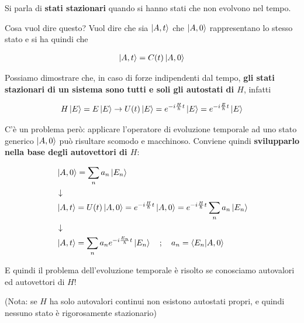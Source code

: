 Si parla di \textbf{stati stazionari} quando si hanno stati che non evolvono nel tempo.

Cosa vuol dire  questo? Vuol dire che sia $\ket{A,t}$ che $\ket{A,0}$ rappresentano lo stesso stato e si ha quindi che

\begin{align}
\ket{A,t}= C(t)\ket{A,0}
\end{align}

Possiamo dimostrare che, in caso di forze indipendenti dal tempo, \textbf{gli stati stazionari di un sistema sono tutti e soli gli autostati di $H$}, infatti

\begin{align}
H\ket{E}= E\ket{E} \rightarrow U(t)\ket{E}= e^{-i\frac{H}{\hbar}t} \ket{E}=e^{-i\frac{E}{\hbar}t} \ket{E}
\end{align}

\bigskip


C'è un problema però: applicare l'operatore di evoluzione temporale ad uno stato generico $\ket{A,0}$ può risultare scomodo e macchinoso. Conviene quindi \textbf{svilupparlo nella base degli autovettori di $H$}:
	
\begin{align}
{}&\ket{A,0}= \sum_{n}a_n \ket{E_n} \\
&\downarrow \nonumber \\
&\ket{A,t}=U(t)\ket{A,0}=e^{-i\frac{H}{\hbar}t}\ket{A,0}= e^{-i\frac{H}{\hbar}t}\sum_{n}a_n \ket{E_n}\\
&\downarrow \nonumber \\
&\ket{A,t}= \sum_{n}a_n e^{-i\frac{E_n}{\hbar}t} \ket{E_n} \quad ; \quad a_n =\braket{E_n|A,0}
\end{align}

E quindi il problema dell'evoluzione temporale è risolto se conosciamo autovalori ed autovettori di $H$! 

(Nota: se $H$ ha solo autovalori continui non esistono autostati propri, e quindi nessuno stato è rigorosamente stazionario)
